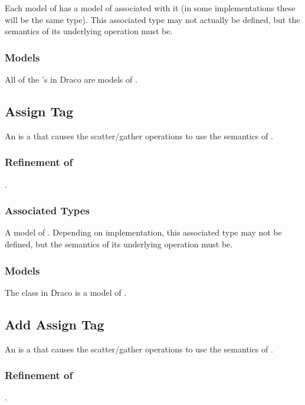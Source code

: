 \documentclass[11pt]{rnote}
\begin{document}
Each model of  has a model of
 associated with it (in some implementations these
will be the same type). This associated type may not actually be
defined, but the semantics of its underlying operation must be.

\subsubsection{Models}

All of the  's in Draco are
models of .

\subsection{Assign Tag}

An  is a  that causes
the  scatter/gather operations to use the semantics of
.

\subsubsection{Refinement of}
.

\subsubsection{Associated Types}

A model of . Depending on implementation, this
associated type may not be defined, but the semantics of its
underlying operation must be.

\subsubsection{Models}

The  class in Draco is a model of
.

\subsection{Add Assign Tag}

An  is a  that
causes the  scatter/gather operations to use the semantics
of .

\subsubsection{Refinement of}
.
\end{document}
